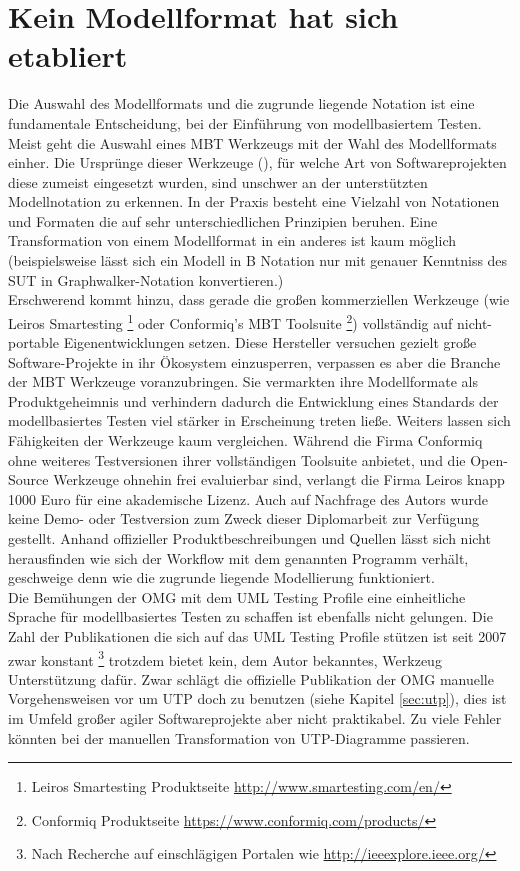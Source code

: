 \section{Kein Modellformat hat sich etabliert}
\label{sec:discussion_format}
Die Auswahl des Modellformats und die zugrunde liegende Notation ist eine fundamentale Entscheidung, bei der Einführung von modellbasiertem Testen. Meist geht die Auswahl eines \Gls{MBT} Werkzeugs mit der Wahl des Modellformats einher. Die Ursprünge dieser Werkzeuge (), für welche Art von Softwareprojekten diese zumeist eingesetzt wurden, sind unschwer an der unterstützten Modellnotation zu erkennen.  In der Praxis besteht eine Vielzahl von Notationen und Formaten die auf sehr unterschiedlichen Prinzipien beruhen. Eine Transformation von einem Modellformat in ein anderes ist kaum möglich (beispielsweise lässt sich ein Modell in B Notation nur mit genauer Kenntniss des \Gls{SUT} in Graphwalker-Notation konvertieren.)\\
Erschwerend kommt hinzu, dass gerade die großen kommerziellen Werkzeuge (wie Leiros Smartesting \footnote{Leiros Smartesting Produktseite \url{http://www.smartesting.com/en/}} oder Conformiq's \Gls{MBT} Toolsuite \footnote{Conformiq Produktseite \url{https://www.conformiq.com/products/}}) vollständig auf nicht-portable Eigenentwicklungen setzen. Diese Hersteller versuchen gezielt große Software-Projekte in ihr Ökosystem einzusperren, verpassen es aber die Branche der \Gls{MBT} Werkzeuge voranzubringen. Sie vermarkten ihre Modellformate als Produktgeheimnis und verhindern dadurch die Entwicklung eines Standards der modellbasiertes Testen viel stärker in Erscheinung treten ließe. Weiters lassen sich Fähigkeiten der Werkzeuge kaum vergleichen. Während die Firma Conformiq ohne weiteres Testversionen ihrer vollständigen Toolsuite anbietet, und die Open-Source Werkzeuge ohnehin frei evaluierbar sind, verlangt die Firma Leiros knapp 1000 Euro für eine akademische Lizenz. Auch auf Nachfrage des Autors wurde keine Demo- oder Testversion zum Zweck dieser Diplomarbeit zur Verfügung gestellt. Anhand offizieller Produktbeschreibungen und Quellen lässt sich nicht herausfinden wie sich der Workflow mit dem genannten Programm verhält, geschweige denn wie die zugrunde liegende Modellierung funktioniert.\\
Die Bemühungen der OMG mit dem UML Testing Profile eine einheitliche Sprache für modellbasiertes Testen zu schaffen ist ebenfalls nicht gelungen. Die Zahl der Publikationen die sich auf das UML Testing Profile stützen ist seit 2007 zwar konstant \footnote{Nach Recherche auf einschlägigen Portalen wie \url{http://ieeexplore.ieee.org/}} trotzdem bietet kein, dem Autor bekanntes, Werkzeug Unterstützung dafür. Zwar schlägt die offizielle Publikation der OMG\cite{_model-driven_2007} manuelle Vorgehensweisen vor um UTP doch zu benutzen (siehe Kapitel \ref{sec:utp}), dies ist im Umfeld großer agiler Softwareprojekte aber nicht praktikabel. Zu viele Fehler könnten bei der manuellen Transformation von UTP-Diagramme passieren.\\
